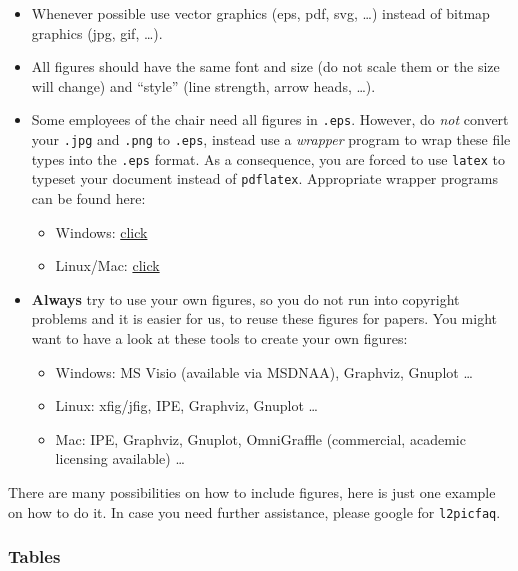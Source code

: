\begin{itemize}
\item Whenever possible use vector graphics (eps, pdf, svg, \ldots) instead of bitmap graphics (jpg, gif, \ldots).
\item All figures should have the same font and size (do not scale them or the size will change) and ``style'' (line strength, arrow heads, \ldots).
\item Some employees of the chair need all figures in \texttt{.eps}. However, do \emph{not} convert your \texttt{.jpg} and \texttt{.png} to \texttt{.eps}, instead use a \emph{wrapper} program to wrap these file types into the \texttt{.eps} format. As a consequence, you are forced to use \texttt{latex} to typeset your document instead of \texttt{pdflatex}. Appropriate wrapper programs can be found here:
\begin{itemize}
\item Windows: \href{https://wiki.crypto.rub.de/WikiCosy/img_auth.php/6/60/JPG-PNGtoEPS.rar}{click}
\item Linux/Mac: \href{http://imgtops.sourceforge.net/}{click}
\end{itemize}
\item \textbf{Always} try to use your own figures, so you do not run into copyright problems and it is easier for us, to reuse these figures for papers. You might want to have a look at these tools to create your own figures:
	\begin{itemize}
	\item Windows: MS Visio (available via MSDNAA), Graphviz, Gnuplot \dots
	\item Linux: xfig/jfig, IPE, Graphviz, Gnuplot \dots
	\item Mac: IPE, Graphviz, Gnuplot, OmniGraffle (commercial, academic licensing available) \dots
	\end{itemize}
\end{itemize}

There are many possibilities on how to include figures, here is just one example on how to do it. In case you need further assistance, please google for \texttt{l2picfaq}.



\subsubsection{Tables}

